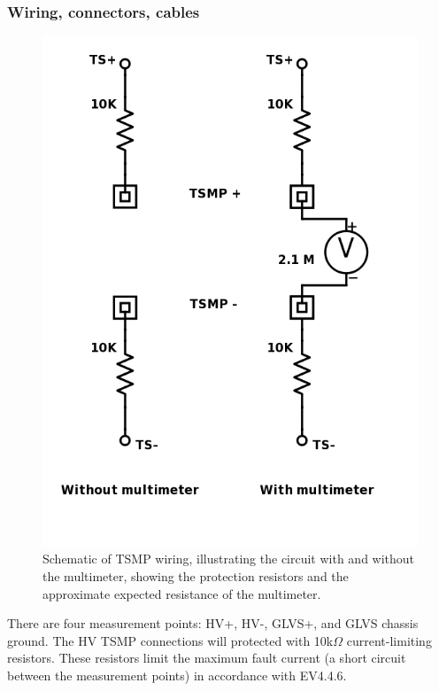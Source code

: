 \documentclass{article}
\begin{document}
\subsubsection{Wiring, connectors, cables}

\begin{figure}[H]
\centering
\includegraphics[scale=0.5]{TSMP-Schematic.png}
\caption{Schematic of TSMP wiring, illustrating the circuit with and without the multimeter, showing the protection resistors and the approximate expected resistance of the multimeter.}
\label{fig:TSMP_schematic}
\end{figure}

There are four measurement points: HV+, HV-, GLVS+, and GLVS chassis ground. The HV TSMP connections will protected with 10k$\Omega$ current-limiting resistors. These resistors limit the maximum fault current (a short circuit between the measurement points) in accordance with EV4.4.6. 
\end{document}
